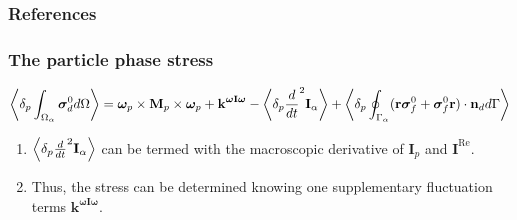 \documentclass{sintefbeamer}
\begin{document}
\begin{frame}[t]
  \frametitle{References}
  
\end{frame}

\begin{frame}
  \frametitle{The particle phase stress}
\begin{equation*}
  \left<\delta_p \int_{\Omega_{\alpha}} \bm{\sigma}_d^0  d\Omega\right>
  =  \bm\omega_p \times \textbf{M}_p\times \bm\omega_p
  + \textbf{k}^{\bm\omega \textbf{I} \bm\omega}
  - \left<\delta_p \frac{d}{dt}^2 \textbf{I}_\alpha\right>
  + \left<\delta_p \oint_{\Gamma_{\alpha}}  (\textbf{r}\bm{\sigma}_f^0 + \bm{\sigma}_f^0\textbf{r})\cdot \textbf{n}_d d\Gamma\right>
\end{equation*}


\begin{enumerate}
  \item $ \left<\delta_p \frac{d}{dt}^2 \textbf{I}_\alpha\right>$ can be termed with the macroscopic derivative of $\textbf{I}_p$ and $\textbf{I}^\text{Re}$. 
  \item Thus, the stress can be determined knowing one supplementary fluctuation terms $\textbf{k}^{\bm\omega \textbf{I} \bm\omega}$.   
\end{enumerate}
\end{frame}
\end{document}

